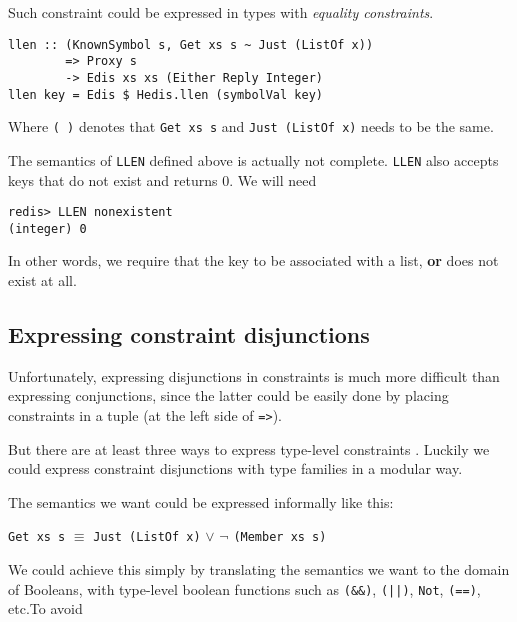 \documentclass[pldi]{sigplanconf-pldi16}
\begin{document}
Such constraint could be expressed in types with
\emph{equality constraints}\cite{typeeq}.

\begin{verbatim}
llen :: (KnownSymbol s, Get xs s ~ Just (ListOf x))
        => Proxy s
        -> Edis xs xs (Either Reply Integer)
llen key = Edis $ Hedis.llen (symbolVal key)
\end{verbatim}

Where \texttt{(~)} denotes that \texttt{Get xs s}
and \texttt{Just (ListOf x)} needs to be the same.

The semantics of \texttt{LLEN} defined above is actually not
complete. \texttt{LLEN} also accepts keys that do not exist and
 returns 0. We will need \emph{}

\begin{verbatim}
redis> LLEN nonexistent
(integer) 0
\end{verbatim}

In other words, we require that the key to be associated with a list,
 \textbf{or} does not exist at all.

\subsection{Expressing constraint disjunctions}

Unfortunately, expressing disjunctions in constraints is much more difficult
than expressing conjunctions, since the latter could be easily done by placing
 constraints in a tuple (at the left side of \texttt{=>}).

But there are at least three ways to express type-level constraints
\cite{singletons}. Luckily we could express constraint disjunctions with type
 families in a modular way.

The semantics we want could be expressed informally like this:

\texttt{Get xs s} $\equiv$ \texttt{Just (ListOf x)}
$\vee$ $\neg$ \texttt{(Member xs s)}

We could achieve this simply by translating the semantics we want to the
domain of Booleans, with type-level boolean functions such as
\texttt{(&&)},
\texttt{(||)}, \texttt{Not},
\texttt{(==)}, etc.\footnotemark To avoid

\end{document}
